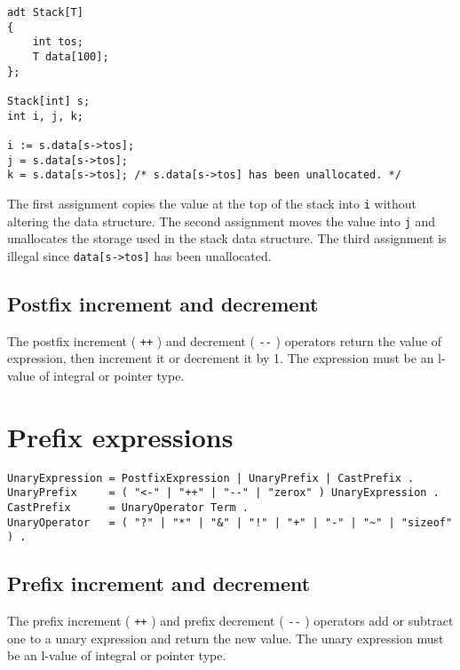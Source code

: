 \begin{lstlisting}
adt Stack[T]
{
    int tos;
    T data[100];
};

Stack[int] s;
int i, j, k;

i := s.data[s->tos];
j = s.data[s->tos];
k = s.data[s->tos]; /* s.data[s->tos] has been unallocated. */
\end{lstlisting}

The first assignment copies the value at the top of the stack into
\passthrough{\lstinline!i!} without altering the data structure. The
second assignment moves the value into \passthrough{\lstinline!j!} and
unallocates the storage used in the stack data structure. The third
assignment is illegal since \passthrough{\lstinline!data[s->tos]!} has
been unallocated.

\hypertarget{postfix-increment-and-decrement}{%
\subsection{Postfix increment and
decrement}\label{postfix-increment-and-decrement}}

The postfix increment ( \passthrough{\lstinline!++!} ) and decrement (
\passthrough{\lstinline!--!} ) operators return the value of expression,
then increment it or decrement it by 1. The expression must be an
l-value of integral or pointer type.

\hypertarget{prefix-expressions}{%
\section{Prefix expressions}\label{prefix-expressions}}

\begin{lstlisting}
UnaryExpression = PostfixExpression | UnaryPrefix | CastPrefix .
UnaryPrefix     = ( "<-" | "++" | "--" | "zerox" ) UnaryExpression .
CastPrefix      = UnaryOperator Term .
UnaryOperator   = ( "?" | "*" | "&" | "!" | "+" | "-" | "~" | "sizeof" ) .
\end{lstlisting}

\hypertarget{prefix-increment-and-decrement}{%
\subsection{Prefix increment and
decrement}\label{prefix-increment-and-decrement}}

The prefix increment ( \passthrough{\lstinline!++!} ) and prefix
decrement ( \passthrough{\lstinline!--!} ) operators add or subtract one
to a unary expression and return the new value. The unary expression
must be an l-value of integral or pointer type.

